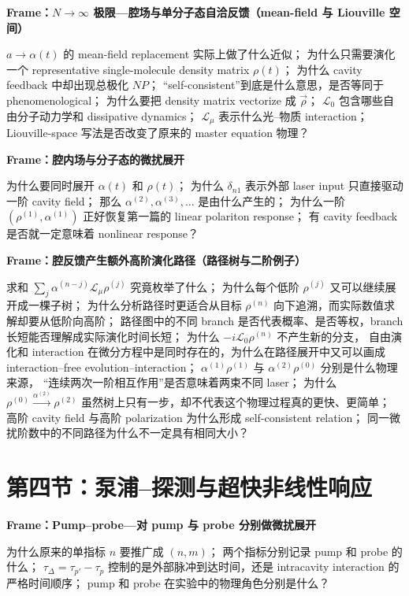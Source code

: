 \documentclass[11pt]{ctexart}
\newcommand{\framecue}[1]{%
  \par\smallskip
  \noindent\textbf{#1}\quad
}
\begin{document}
\framecue{Frame：\(N\to\infty\) 极限---腔场与单分子态自洽反馈（mean-field 与 Liouville 空间）}
\(a\rightarrow\alpha(t)\) 的 mean-field replacement 实际上做了什么近似；
为什么只需要演化一个 representative single-molecule density matrix \(\rho(t)\)；
为什么 cavity feedback 中却出现总极化 \(NP\)；
``self-consistent''到底是什么意思，是否等同于 phenomenological；
为什么要把 density matrix vectorize 成 \(\vec\rho\)；
\(\mathcal L_0\) 包含哪些自由分子动力学和 dissipative dynamics；
\(\mathcal L_\mu\) 表示什么光--物质 interaction；
Liouville-space 写法是否改变了原来的 master equation 物理？

\framecue{Frame：腔内场与分子态的微扰展开}
为什么要同时展开 \(\alpha(t)\) 和 \(\rho(t)\)；
为什么 \(\delta_{n1}\) 表示外部 laser input 只直接驱动一阶 cavity field；
那么 \(\alpha^{(2)},\alpha^{(3)},\ldots\) 是由什么产生的；
为什么一阶 \((\rho^{(1)},\alpha^{(1)})\) 正好恢复第一篇的 linear polariton response；
有 cavity feedback 是否就一定意味着 nonlinear response？

\framecue{Frame：腔反馈产生额外高阶演化路径（路径树与二阶例子）}
求和 \(\sum_j\alpha^{(n-j)}\mathcal L_\mu\rho^{(j)}\) 究竟枚举了什么；
为什么每个低阶 \(\rho^{(j)}\) 又可以继续展开成一棵子树；
为什么分析路径时更适合从目标 \(\rho^{(n)}\) 向下追溯，而实际数值求解却要从低阶向高阶；
路径图中的不同 branch 是否代表概率、是否等权，branch 长短能否理解成实际演化时间长短；
为什么 \(-i\mathcal L_0\rho^{(n)}\) 不产生新的分支，
自由演化和 interaction 在微分方程中是同时存在的，为什么在路径展开中又可以画成
interaction--free evolution--interaction；
\(\alpha^{(1)}\rho^{(1)}\) 与 \(\alpha^{(2)}\rho^{(0)}\) 分别是什么物理来源，
``连续两次一阶相互作用''是否意味着两束不同 laser；
为什么 \(\rho^{(0)}\xrightarrow{\alpha^{(2)}}\rho^{(2)}\) 虽然树上只有一步，却不代表这个物理过程真的更快、更简单；
高阶 cavity field 与高阶 polarization 为什么形成 self-consistent relation；
同一微扰阶数中的不同路径为什么不一定具有相同大小？

\section*{第四节：泵浦--探测与超快非线性响应}

\framecue{Frame：Pump--probe---对 pump 与 probe 分别做微扰展开}
为什么原来的单指标 \(n\) 要推广成 \((n,m)\)；
两个指标分别记录 pump 和 probe 的什么；
\(\tau_\Delta=\tau_{p'}-\tau_p\) 控制的是外部脉冲到达时间，还是 intracavity interaction 的严格时间顺序；
pump 和 probe 在实验中的物理角色分别是什么？
\end{document}
